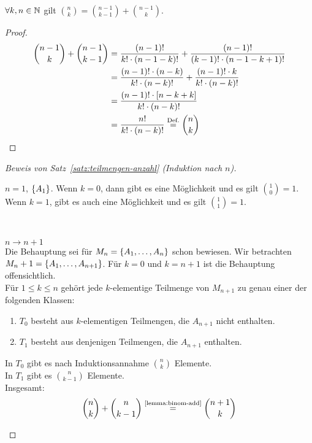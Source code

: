 \begin{lemma}
    \label{lemma:binom-add}
    $\forall k,n\in\naturalnumbers$ gilt $\binom{n}{k} = \binom{n-1}{k-1} + \binom{n-1}{k}$.
    \begin{proof}
        \begin{align*}
            \binom{n-1}{k} + \binom{n-1}{k-1} &= \frac{(n-1)!}{k!\cdot(n-1-k)!} + \frac{(n-1)!}{(k-1)!\cdot(n-1-k+1)!}\\
            &= \frac{(n-1)!\cdot(n-k)}{k!\cdot(n-k)!} + \frac{(n-1)!\cdot k}{k!\cdot(n-k)!}\\
            &= \frac{(n-1)!\cdot\interv{n-k+k}}{k!\cdot(n-k)!}\\
            &= \frac{n!}{k!\cdot(n-k)!} \annot{=}{Def.} \binom{n}{k}\qedhere
        \end{align*}
    \end{proof}
\end{lemma}
\begin{proof}[Beweis von Satz~\ref{satz:teilmengen-anzahl} (Induktion nach $n$)]
    ~\\
    \begin{induktionsanfang}
        $n=1$, $\set{A_1}$. Wenn $k=0$, dann gibt es eine Möglichkeit und es gilt $\binom{1}{0} = 1$. Wenn $k=1$, gibt es auch eine Möglichkeit und es gilt $\binom{1}{1} = 1$.\\
    \end{induktionsanfang}
    \\
    \begin{induktionsschritt}
        $n\rightarrow n+1$\\
        Die Behauptung sei für $M_n=\set{A_1, \dots, A_n}$ schon bewiesen. Wir betrachten $M_n+1 = \set{A_1, \dots, A_{n+1}}$. Für $k=0$ und $k=n+1$ ist die Behauptung offensichtlich.\\
        Für $1\leq k \leq n$ gehört jede $k$-elementige Teilmenge von $M_{n+1}$ zu genau einer der folgenden Klassen:
        \begin{enumerate}
            \item $T_0$ besteht aus $k$-elementigen Teilmengen, die $A_{n+1}$ nicht enthalten.
            \item $T_1$ besteht aus denjenigen Teilmengen, die $A_{n+1}$ enthalten.
        \end{enumerate}
        \noindent In $T_0$ gibt es nach Induktionsannahme $\binom{n}{k}$ Elemente.\\
        In $T_1$ gibt es $\binom{n}{k-1}$ Elemente\footnotemark.\\
        Insgesamt:
        \begin{equation*}
            \binom{n}{k}+\binom{n}{k-1}\annot{=}{\ref{lemma:binom-add}}\binom{n+1}{k}\qedhere
        \end{equation*}
    \end{induktionsschritt}
\end{proof}

